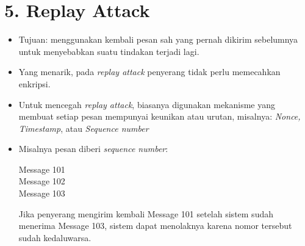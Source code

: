 \documentclass{article}
\begin{document}

\section*{5. Replay Attack}

\begin{itemize}
    \item Tujuan: menggunakan kembali pesan sah yang pernah dikirim sebelumnya untuk menyebabkan suatu tindakan terjadi lagi.
    \item Yang menarik, pada \textit{replay attack} penyerang tidak perlu memecahkan enkripsi.
    \item Untuk mencegah \textit{replay attack}, biasanya digunakan mekanisme yang membuat setiap pesan mempunyai keunikan atau urutan, misalnya: \textit{Nonce, Timestamp}, atau \textit{Sequence number}
    \item Misalnya pesan diberi \textit{sequence number}:
    
    Message 101 \\
    Message 102 \\
    Message 103
    
    Jika penyerang mengirim kembali Message 101 setelah sistem sudah menerima Message 103, sistem dapat menolaknya karena nomor tersebut sudah kedaluwarsa.
\end{itemize}
\end{document}
